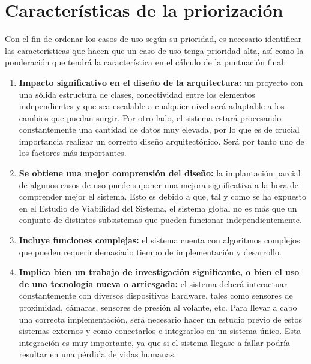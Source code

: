 \section{Características de la priorización}

\par Con el fin de ordenar los casos de uso según su prioridad, es necesario identificar las características que hacen que un caso de uso tenga prioridad alta, así como la ponderación que tendrá la característica en el cálculo de la puntuación final:

\begin{enumerate}

\item \textbf{Impacto significativo en el diseño de la arquitectura:} un proyecto con una sólida estructura de clases, conectividad entre los elementos independientes y que sea escalable a cualquier nivel será adaptable a los cambios que puedan surgir. Por otro lado, el sistema estará procesando constantemente una cantidad de datos muy elevada, por lo que es de crucial importancia realizar un correcto diseño arquitectónico. Será por tanto uno de los factores más importantes.

\item \textbf{Se obtiene una mejor comprensión del diseño:} la implantación parcial de algunos casos de uso puede suponer una mejora significativa a la hora de comprender mejor el sistema. Esto es debido a que, tal y como se ha expuesto en el Estudio de Viabilidad del Sistema, el sistema global no es más que un conjunto de distintos subsistemas que pueden funcionar independientemente.

\item \textbf{Incluye funciones complejas:} el sistema cuenta con algoritmos complejos que pueden requerir demasiado tiempo de implementación y desarrollo.

\item \textbf{Implica bien un trabajo de investigación significante, o bien el uso de una tecnología nueva o arriesgada:} el sistema deberá interactuar constantemente con diversos dispositivos hardware, tales como sensores de proximidad, cámaras, sensores de presión al volante, etc. Para llevar a cabo una correcta implementación, será necesario hacer un estudio previo de estos sistemas externos y como conectarlos e integrarlos en un sistema único. Esta integración es muy importante, ya que si el sistema llegase a fallar podría resultar en una pérdida de vidas humanas.


\end{enumerate}

